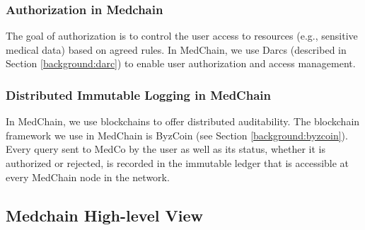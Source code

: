
\subsubsection{Authorization in Medchain}\label{arch:authorization}
The goal of authorization is to control the user access to resources (e.g., sensitive medical data) based on agreed rules. In MedChain, we use Darcs (described in Section \ref{background:darc}) to enable user authorization and access management. 


\subsubsection{Distributed Immutable Logging in MedChain} \label{arch:audit}

In MedChain, we use blockchains to offer distributed auditability. The blockchain framework we use in MedChain is ByzCoin (see Section \ref{background:byzcoin}). Every query sent to MedCo by the user as well as its status, whether it is authorized or rejected, is recorded in the immutable ledger that is accessible at every MedChain node in the network.  

\subsection{Medchain High-level View} \label{arch:high-level view}

